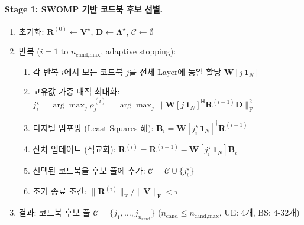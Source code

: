 \documentclass[10pt]{article}
\begin{document}
\paragraph{Stage 1: SWOMP 기반 코드북 후보 선별.}
\begin{enumerate}
    \item 초기화: $\mathbf{R}^{(0)} \gets \mathbf{V}^{\star}$, 
          $\mathbf{D} \gets \boldsymbol{\Lambda}^{\star}$,
          $\mathcal{C} \gets \emptyset$
    \item 반복 ($i = 1$ to $n_{\text{cand,max}}$, adaptive stopping):
    \begin{enumerate}
        \item 각 반복 $i$에서 모든 코드북 $j$를 전체 Layer에 동일 할당 $\mathbf{W}[j\,\mathbf{1}_N]$
        \item 고유값 가중 내적 최대화: $j_i^{\star} = \arg\max_j \rho_j^{(i)} = \arg\max_j \|\mathbf{W}[j\,\mathbf{1}_N]^{\mathsf{H}} \mathbf{R}^{(i-1)} \mathbf{D}\|_{\text{F}}^2$
        \item 디지털 빔포밍 (Least Squares 해): $\mathbf{B}_i = \mathbf{W}[j_i^{\star}\,\mathbf{1}_N]^{\dagger} \mathbf{R}^{(i-1)}$
        \item 잔차 업데이트 (직교화): $\mathbf{R}^{(i)} = \mathbf{R}^{(i-1)} - \mathbf{W}[j_i^{\star}\,\mathbf{1}_N] \mathbf{B}_i$
        \item 선택된 코드북을 후보 풀에 추가: $\mathcal{C} = \mathcal{C} \cup \{j_i^{\star}\}$
        \item 조기 종료 조건: $\|\mathbf{R}^{(i)}\|_{\text{F}}/\|\mathbf{V}\|_{\text{F}} < \tau$
    \end{enumerate}
    \item 결과: 코드북 후보 풀 $\mathcal{C} = \{j_1, \ldots, j_{n_{\text{cand}}}\}$ ($n_{\text{cand}} \leq n_{\text{cand,max}}$, UE: 4개, BS: 4-32개)
\end{enumerate}
\end{document}
